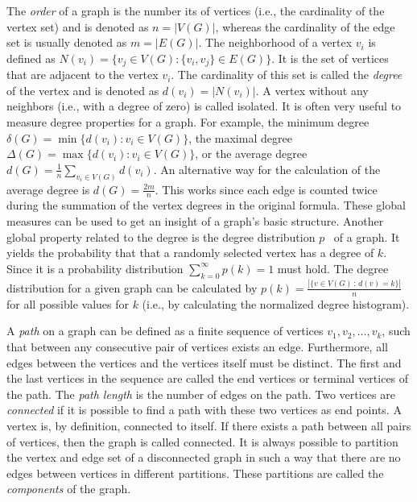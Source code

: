 The \emph{order} of a graph is the number its of vertices (i.e., the cardinality of the vertex set) and is denoted as \(n = |V(G)|\), whereas the cardinality of the edge set is usually denoted as \(m = |E(G)|\).
The neighborhood of a vertex \(v_i\) is defined as \(N(v_i) = \{v_j \in V(G) : \{v_i, v_j \} \in E(G)\}\).
It is the set of vertices that are adjacent to the vertex \(v_i\).
The cardinality of this set is called the \emph{degree} of the vertex and is denoted as \(d(v_i) = |N(v_i)|\).
A vertex without any neighbors (i.e., with a degree of zero) is called isolated.
It is often very useful to measure degree properties for a graph.
For example, the minimum degree \(\delta(G) = \min\{d(v_i) : v_i \in V(G)\}\), the maximal degree \(\Delta(G) = \max\{d(v_i) : v_i \in V(G)\}\), or the average degree \(d(G) = \frac{1}{n} \sum_{v_i \in V(G)} d(v_i)\).
An alternative way for the calculation of the average degree is \(d(G) = \frac{2m}{n}\).
This works since each edge is counted twice during the summation of the vertex degrees in the original formula.
These global measures can be used to get an insight of a graph's basic structure.
Another global property related to the degree is the degree distribution \(p\)~\cite{Barabasi2016} of a graph.
It yields the probability that that a randomly selected vertex has a degree of \(k\).
Since it is a probability distribution \(\sum_{k=0}^\infty p(k) = 1\) must hold.
The degree distribution for a given graph can be calculated by \(p(k) = \frac{|\{v \in V(G) \,:\, d(v) = k\}|}{n}\) for all possible values for \( k \) (i.e., by calculating the normalized degree histogram).

A \emph{path} on a graph can be defined as a finite sequence of vertices \(v_1,v_2,\dots,v_k\), such that between any consecutive pair of vertices exists an edge.
Furthermore, all edges between the vertices and the vertices itself must be distinct.
The first and the last vertices in the sequence are called the end vertices or terminal vertices of the path.
The \emph{path length} is the number of edges on the path.
Two vertices are \emph{connected} if it is possible to find a path with these two vertices as end points.
A vertex is, by definition, connected to itself.
If there exists a path between all pairs of vertices, then the graph is called connected.
It is always possible to partition the vertex and edge set of a disconnected graph in such a way that there are no edges between vertices in different partitions.
These partitions are called the \emph{components} of the graph.


